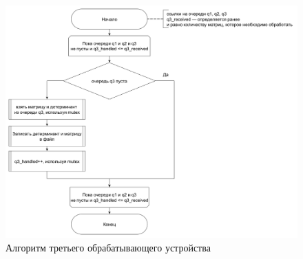 \begin{figure}[h]
	\centering
	\includegraphics[height=0.5\textheight]{img/q3.png}
	\caption{Алгоритм третьего обрабатывающего устройства}
	\label{fig:q3}
\end{figure}


